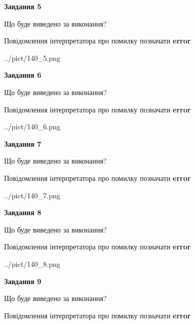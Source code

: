 \documentclass[11pt, ukrainian]{article}
\begin{document}
{\begin {large}
{\begin {center}\textbf{Завдання 5}\end {center}}\par
Що буде виведено за виконання? \par
Повідомлення інтерпретатора про помилку позначати \textbf{error}

\begin{center}
	{../pict/140_5.png}
\end{center}
\newpage

{\begin {center}\textbf{Завдання 6}\end {center}}\par
Що буде виведено за виконання? \par
Повідомлення інтерпретатора про помилку позначати \textbf{error}

\begin{center}
	{../pict/140_6.png}
\end{center}
\newpage

{\begin {center}\textbf{Завдання 7}\end {center}}\par
Що буде виведено за виконання? \par
Повідомлення інтерпретатора про помилку позначати \textbf{error}

\begin{center}
	{../pict/140_7.png}
\end{center}
\newpage

{\begin {center}\textbf{Завдання 8}\end {center}}\par
Що буде виведено за виконання? \par
Повідомлення інтерпретатора про помилку позначати \textbf{error}

\begin{center}
	{../pict/140_8.png}
\end{center}
\newpage

{\begin {center}\textbf{Завдання 9}\end {center}}\par
Що буде виведено за виконання? \par
Повідомлення інтерпретатора про помилку позначати \textbf{error}


\end{large}}
\end{document}
